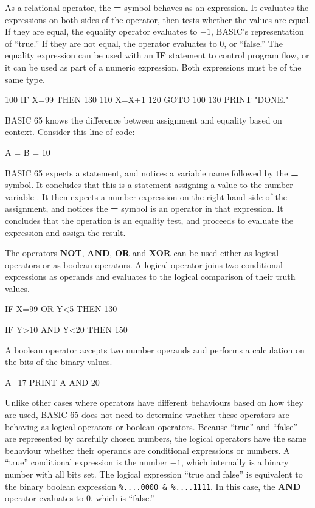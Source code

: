 As a relational operator, the {\bf =} symbol behaves as an expression. It evaluates the expressions on both sides of the operator, then tests whether the values are equal. If they are equal, the equality operator evaluates to $-1$, BASIC's representation of ``true.'' If they are not equal, the operator evaluates to 0, or ``false.'' The equality expression can be used with an {\bf IF} statement to control program flow, or it can be used as part of a numeric expression. Both expressions must be of the same type.

\begin{screencode}
100 IF X=99 THEN 130
110 X=X+1
120 GOTO 100
130 PRINT "DONE."
\end{screencode}

BASIC 65 knows the difference between assignment and equality based on context. Consider this line of code:

\begin{screencode}
A = B = 10
\end{screencode}

BASIC 65 expects a statement, and notices a variable name followed by the {\bf =} symbol. It concludes that this is a statement assigning a value to the number variable . It then expects a number expression on the right-hand side of the assignment, and notices the {\bf =} symbol is an operator in that expression. It concludes that the operation is an equality test, and proceeds to evaluate the expression and assign the result.

The operators {\bf NOT}, {\bf AND}, {\bf OR} and {\bf XOR} can be used either as logical operators or as boolean operators. A logical operator joins two conditional expressions as operands and evaluates to the logical comparison of their truth values.

\begin{screencode}
IF X=99 OR Y<5 THEN 130

IF Y>10 AND Y<20 THEN 150
\end{screencode}

A boolean operator accepts two number operands and performs a calculation on the bits of the binary values.

\begin{screencode}
A=17
PRINT A AND 20
\end{screencode}

Unlike other cases where operators have different behaviours based on how they are used, BASIC 65 does not need to determine whether these operators are behaving as logical operators or boolean operators. Because ``true'' and ``false'' are represented by carefully chosen numbers, the logical operators have the same behaviour whether their operands are conditional expressions or numbers. A ``true'' conditional expression is the number $-1$, which internally is a binary number with all bits set. The logical expression ``true and false'' is equivalent to the binary boolean expression {\tt \%....0000 \& \%....1111}. In this case, the {\bf AND} operator evaluates to 0, which is ``false.''

